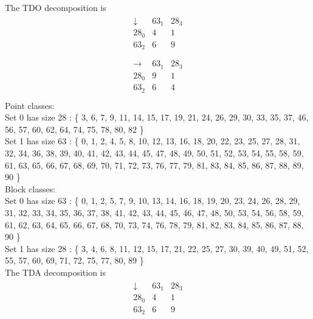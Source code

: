 \bigskip

The TDO decomposition is
\begin{align*}
\begin{array}{r|*{2}{r}}
\downarrow  &     63_{  1} &     28_{  3}\\
\hline
    28_{  0} &            4 &            1\\
    63_{  2} &            6 &            9\\
\end{array}
\end{align*}
\begin{align*}
\begin{array}{r|*{2}{r}}
\rightarrow  &     63_{  1} &     28_{  3}\\
\hline
    28_{  0} &            9 &            1\\
    63_{  2} &            6 &            4\\
\end{array}
\end{align*}
Point classes:\\
Set 0 has size 28 : \{ 3, 6, 7, 9, 11, 14, 15, 17, 19, 21, 24, 26, 29, 30, 33, 35, 37, 46, 56, 57, 60, 62, 64, 74, 75, 78, 80, 82 \}\\
Set 1 has size 63 : \{ 0, 1, 2, 4, 5, 8, 10, 12, 13, 16, 18, 20, 22, 23, 25, 27, 28, 31, 32, 34, 36, 38, 39, 40, 41, 42, 43, 44, 45, 47, 48, 49, 50, 51, 52, 53, 54, 55, 58, 59, 61, 63, 65, 66, 67, 68, 69, 70, 71, 72, 73, 76, 77, 79, 81, 83, 84, 85, 86, 87, 88, 89, 90 \}\\
Block classes:\\
Set 0 has size 63 : \{ 0, 1, 2, 5, 7, 9, 10, 13, 14, 16, 18, 19, 20, 23, 24, 26, 28, 29, 31, 32, 33, 34, 35, 36, 37, 38, 41, 42, 43, 44, 45, 46, 47, 48, 50, 53, 54, 56, 58, 59, 61, 62, 63, 64, 65, 66, 67, 68, 70, 73, 74, 76, 78, 79, 81, 82, 83, 84, 85, 86, 87, 88, 90 \}\\
Set 1 has size 28 : \{ 3, 4, 6, 8, 11, 12, 15, 17, 21, 22, 25, 27, 30, 39, 40, 49, 51, 52, 55, 57, 60, 69, 71, 72, 75, 77, 80, 89 \}\\
The TDA decomposition is
\begin{align*}
\begin{array}{r|*{2}{r}}
\downarrow  &     63_{  1} &     28_{  3}\\
\hline
    28_{  0} &            4 &            1\\
    63_{  2} &            6 &            9\\
\end{array}
\end{align*}
